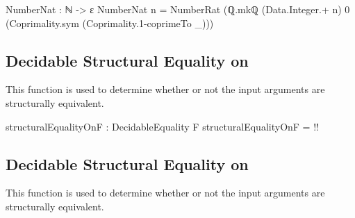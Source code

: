 \documentclass{report}
\begin{document}
\begin{code}
NumberNat : ℕ -> ε
NumberNat n = NumberRat (ℚ.mkℚ (Data.Integer.+ n)
                               0
                               (Coprimality.sym (Coprimality.1-coprimeTo _)))
\end{code}
\subsection{Decidable Structural Equality on }
This function is used to determine whether or not the input arguments are structurally equivalent.

\begin{code}
structuralEqualityOnF : DecidableEquality F
structuralEqualityOnF = {!!}
\end{code}

\subsection{Decidable Structural Equality on }
This function is used to determine whether or not the input arguments are structurally equivalent.
\end{document}
